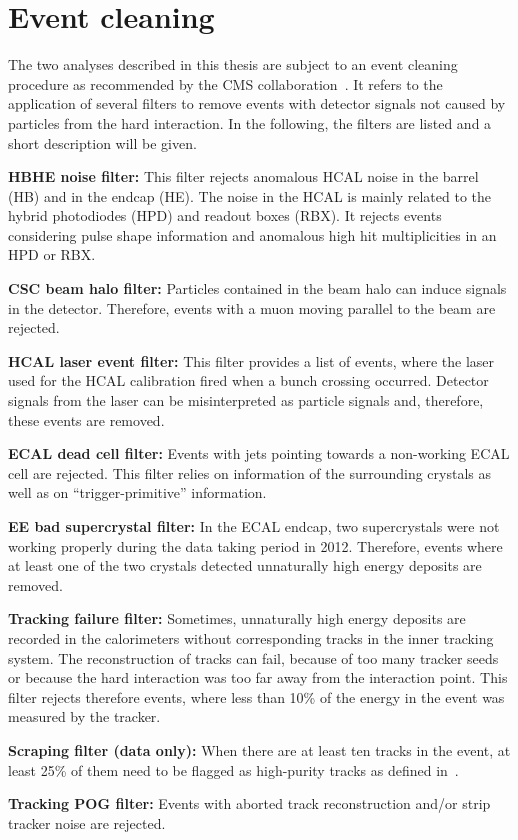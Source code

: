 \section{Event cleaning}
The two analyses described in this thesis are subject to an event cleaning procedure as recommended by the CMS collaboration~\cite{bib:CMS:EventCleaning}.
It refers to the application of several filters to remove events with detector signals not caused by particles from the hard interaction. 
In the following, the filters are listed and a short description will be given.
\begin{description} 
\item \textbf{HBHE noise filter:} This filter rejects anomalous HCAL noise in the barrel (HB) and in the endcap (HE). 
                                  The noise in the HCAL is mainly related to the hybrid photodiodes (HPD) and readout boxes (RBX). 
                                  It rejects events considering pulse shape information and anomalous high hit multiplicities in an HPD or RBX.
\item \textbf{CSC beam halo filter:} Particles contained in the beam halo can induce signals in the detector. 
                                     Therefore, events with a muon moving parallel to the beam are rejected.  
\item \textbf{HCAL laser event filter:} This filter provides a list of events, where the laser used for the HCAL calibration fired when a bunch crossing occurred. 
                                        Detector signals from the laser can be misinterpreted as particle signals and, therefore, these events are removed.
\item \textbf{ECAL dead cell filter:} Events with jets pointing towards a non-working ECAL cell are rejected. 
                                      This filter relies on information of the surrounding crystals as well as on ``trigger-primitive'' information.
\item \textbf{EE bad supercrystal filter:} In the ECAL endcap, two supercrystals were not working properly during the data taking period in 2012. 
                                           Therefore, events where at least one of the two crystals detected unnaturally high energy deposits are removed. 
\item \textbf{Tracking failure filter:} Sometimes, unnaturally high energy deposits are recorded in the calorimeters without corresponding tracks in the inner tracking system. 
                                        The reconstruction of tracks can fail, because of too many tracker seeds or because the hard interaction was too far away from the interaction point.
                                        This filter rejects therefore events, where less than 10\% of the energy in the event was measured by the tracker.  
\item \textbf{Scraping filter (data only):} When there are at least ten tracks in the event, at least 25\% of them need to be flagged as high-purity tracks as defined in~\cite{bib:CMS:Tracking_2010}.
\item \textbf{Tracking POG filter:} Events with aborted track reconstruction and/or strip tracker noise are rejected.
\end{description}
